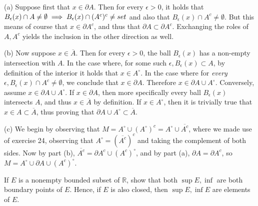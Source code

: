 \begin{solution}
    
    (a) Suppose first that $x \in \partial A$.
    Then for every $\epsilon > 0$, it holds that $B_{\epsilon}(x) \cap A \neq \emptyset \implies B_{\epsilon}(x) \cap (A^c)^c \neq \empty set$ and also that $B_{\epsilon}(x) \cap A^c \neq \emptyset$.
    But this means of course that $x \in \partial A^c$, and thus that $\partial A \subset \partial A^c$.
    Exchanging the roles of $A, A^c$ yields the inclusion in the other direction as well.

    (b) Now suppose $x \in \overline{A}$.
    Then for every $\epsilon > 0$, the ball $B_{\epsilon}(x)$ has a non-empty intersection with $A$.
    In the case where, for some such $\epsilon, B_{\epsilon}(x) \subset A$, by definition of the interior it holds that $x \in A^\circ$.
    In the case where for \textit{every} $\epsilon, B_{\epsilon}(x) \cap A^c \neq \emptyset$, we conclude that $x \in \partial A$.
    Therefore $x \in \partial A \cup A^\circ$.
    Conversely, assume $x \in \partial A \cup A^\circ$.
    If $x \in \partial A$, then more specifically every ball $B_{\epsilon}(x)$ intersects $A$, and thus $x \in \overline{A}$ by definition.
    If $x \in A^\circ$, then it is trivially true that $x \in A \subset \overline{A}$, thus proving that $\partial A \cup A^\circ \subset \overline{A}$.

    (c) We begin by observing that $M = A^\circ \cup (A^\circ)^c = A^\circ \cup \overline{A^c}$, where we made use of exercise 24, observing that $A^\circ = (\overline{A^c})^c$ and taking the complement of both sides.
    Now by part (b), $\overline{A^c} = \partial A^c \cup (A^c)^\circ$, and by part (a), $\partial A = \partial A^c$, so $M = A^\circ \cup \partial A \cup (A^c)^\circ$.
\end{solution}

\begin{exercise}{42}
    If $E$ is a nonempty bounded subset of $\mathbb{R}$, show that both $\sup E, \inf $ are both boundary points of $E$.
    Hence, if $E$ is also closed, then $\sup E, \inf E$ are elements of $E$.
\end{exercise}

